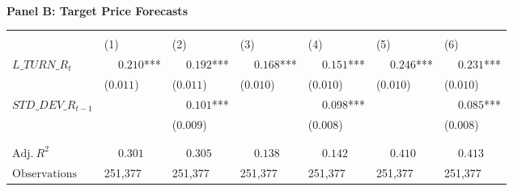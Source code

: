 \begin{table}
\centering\fontsize{9}{11}\selectfont

\begin{threeparttable}
\phantom{ }\\
\textbf{Panel B: Target Price Forecasts}
\begin{tabular}[t]{>{\raggedright\arraybackslash}p{3.1cm}>{\raggedright\arraybackslash}p{1.6cm}>{\raggedright\arraybackslash}p{1.6cm}>{\raggedright\arraybackslash}p{1.6cm}>{\raggedright\arraybackslash}p{1.6cm}>{\raggedright\arraybackslash}p{1.6cm}>{\raggedright\arraybackslash}p{1.6cm}}
\toprule
\multicolumn{1}{c}{ } & \multicolumn{2}{c}{$PRC\_DISP\_R_t$} & \multicolumn{2}{c}{$PRC\_AFE\_R_t$} & \multicolumn{2}{c}{$PRC\_RANGE\_R_t$} \\
\cmidrule(l{3pt}r{3pt}){2-3} \cmidrule(l{3pt}r{3pt}){4-5} \cmidrule(l{3pt}r{3pt}){6-7}
 & \phantom{-}(1) & \phantom{-}(2) & \phantom{-}(3) & \phantom{-}(4) & \phantom{-}(5) & \phantom{-}(6)\\
\midrule
$L\_TURN\_R_t$ & $\phantom{-}0.210$*** & $\phantom{-}0.192$*** & $\phantom{-}0.168$*** & $\phantom{-}0.151$*** & $\phantom{-}0.246$*** & $\phantom{-}0.231$***\\
 & (\phantom{-}$0.011$) & (\phantom{-}$0.011$) & (\phantom{-}$0.010$) & (\phantom{-}$0.010$) & (\phantom{-}$0.010$) & (\phantom{-}$0.010$)\\
\addlinespace
$STD\_DEV\_R_{t-1}$ &  & $\phantom{-}0.101$*** &  & $\phantom{-}0.098$*** &  & $\phantom{-}0.085$***\\
 &  & (\phantom{-}$0.009$) &  & (\phantom{-}$0.008$) &  & (\phantom{-}$0.008$)\\
 &  &  &  &  &  \vphantom{1} & \\
\midrule
 &  &  &  &  &  & \\
$\textrm{Adj.} \: R^2$ & {$\phantom{-}0.301$} & {$\phantom{-}0.305$} & {$\phantom{-}0.138$} & {$\phantom{-}0.142$} & {$\phantom{-}0.410$} & {$\phantom{-}0.413$}\\
$\textrm{Observations}$ & {\phantom{-}251,377} & {\phantom{-}251,377} & {\phantom{-}251,377} & {\phantom{-}251,377} & {\phantom{-}251,377} & {\phantom{-}251,377}\\
\bottomrule
\end{tabular}
\begin{tablenotes}
\item 
\end{tablenotes}
\end{threeparttable}




\centering\fontsize{9}{11}\selectfont


\end{table}
